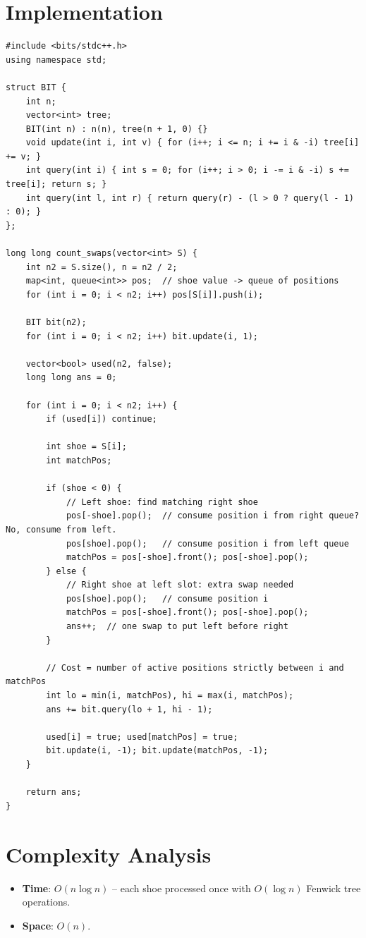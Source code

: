 \documentclass[11pt,a4paper]{article}
\begin{document}
\section{Implementation}

\begin{lstlisting}
#include <bits/stdc++.h>
using namespace std;

struct BIT {
    int n;
    vector<int> tree;
    BIT(int n) : n(n), tree(n + 1, 0) {}
    void update(int i, int v) { for (i++; i <= n; i += i & -i) tree[i] += v; }
    int query(int i) { int s = 0; for (i++; i > 0; i -= i & -i) s += tree[i]; return s; }
    int query(int l, int r) { return query(r) - (l > 0 ? query(l - 1) : 0); }
};

long long count_swaps(vector<int> S) {
    int n2 = S.size(), n = n2 / 2;
    map<int, queue<int>> pos;  // shoe value -> queue of positions
    for (int i = 0; i < n2; i++) pos[S[i]].push(i);

    BIT bit(n2);
    for (int i = 0; i < n2; i++) bit.update(i, 1);

    vector<bool> used(n2, false);
    long long ans = 0;

    for (int i = 0; i < n2; i++) {
        if (used[i]) continue;

        int shoe = S[i];
        int matchPos;

        if (shoe < 0) {
            // Left shoe: find matching right shoe
            pos[-shoe].pop();  // consume position i from right queue? No, consume from left.
            pos[shoe].pop();   // consume position i from left queue
            matchPos = pos[-shoe].front(); pos[-shoe].pop();
        } else {
            // Right shoe at left slot: extra swap needed
            pos[shoe].pop();   // consume position i
            matchPos = pos[-shoe].front(); pos[-shoe].pop();
            ans++;  // one swap to put left before right
        }

        // Cost = number of active positions strictly between i and matchPos
        int lo = min(i, matchPos), hi = max(i, matchPos);
        ans += bit.query(lo + 1, hi - 1);

        used[i] = true; used[matchPos] = true;
        bit.update(i, -1); bit.update(matchPos, -1);
    }

    return ans;
}
\end{lstlisting}

\section{Complexity Analysis}
\begin{itemize}
  \item \textbf{Time}: $O(n \log n)$ -- each shoe processed once with $O(\log n)$ Fenwick tree operations.
  \item \textbf{Space}: $O(n)$.
\end{itemize}
\end{document}
